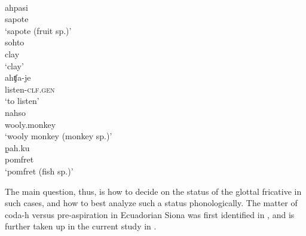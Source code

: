 \documentclass[output=paper]{langscibook}
\begin{document}
\begin{exe}
\ex\label{exe-hcoda-parse}
\begin{xlist}%
\ex
\glll [ah.pa.si]\\
ahpasi\\
sapote\\
\trans `sapote (fruit sp.)'
\ex
\glll [soh.to]\\
sohto\\
clay\\
\trans `clay'
\ex
\glll [ah.ʧa.je]\\
ahʧa-je\\
listen-\textsc{clf.gen}\\
\trans `to listen'%
\ex
\glll [nãh̃.so]\\
nahso\\
wooly.monkey\\
\trans `wooly monkey (monkey sp.)'
\ex
\glll [p̰ah.ku]\\
p̰ah.ku\\
pomfret\\
\trans `pomfret (fish sp.)'
\end{xlist}
\end{exe}

The main question, thus, is how to decide on the status of the glottal fricative in such cases, and how to best analyze such a status phonologically. The matter of coda-h versus pre-aspiration in Ecuadorian Siona was first identified in \citet[102--106]{Bruil:2014}, and is further taken up in the current study in .
\end{document}
